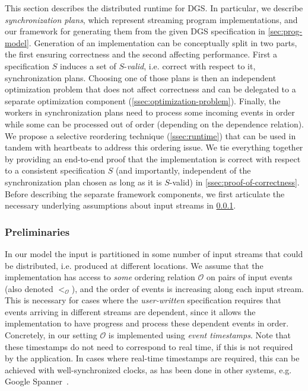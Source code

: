 This section describes the distributed runtime for DGS.
In particular, we describe \emph{synchronization plans},
which represent streaming program implementations, and our
framework for generating them from the given DGS specification
in \cref{sec:prog-model}.
Generation of an implementation can be
conceptually split in two parts, the first ensuring correctness and
the second affecting performance. First a specification $S$ induces a set of
$S$-\emph{valid}, i.e. correct with respect to it, synchronization
plans. Choosing one of those plans is then an independent optimization
problem that does not affect correctness and can be delegated to a
separate optimization component (\cref{ssec:optimization-problem}).
Finally, the workers in synchronization plans
need to process some incoming events in order while some can be
processed out of order (depending on the dependence relation).  We
propose a selective reordering technique
(\cref{ssec:runtime}) that can be used in tandem with heartbeats to
address this ordering issue.
We tie everything together by providing an end-to-end proof that the
implementation is correct with respect to a consistent specification
$S$ (and importantly, independent of the synchronization plan chosen
as long as it is $S$-valid) in \cref{ssec:proof-of-correctness}.
Before describing the separate framework components, we first
articulate the necessary underlying assumptions about input streams in
\cref{ssec:distributed-assumptions}.

\subsubsection{Preliminaries}
\label{ssec:distributed-assumptions}

In our model the input is partitioned in some number of input streams that could be distributed, i.e. produced at different locations.
We assume that the implementation has access to \emph{some} ordering
relation $\mathcal{O}$ on pairs of input events (also denoted
$<_{\mathcal{O}}$), and the order of events is increasing along each
input stream. This is necessary for cases where the
\emph{user-written} specification requires that events arriving in
different streams are dependent, since it allows the implementation to
have progress and process these dependent events in order.
Concretely, in our setting $\mathcal{O}$ is implemented using \emph{event timestamps}.
Note that these timestamps do not need to correspond to real time, if this is not required by the application.
In cases where real-time timestamps are required, this can be achieved with well-synchronized clocks, as has been done in other systems, e.g. Google Spanner~\cite{corbett2013spanner}.

